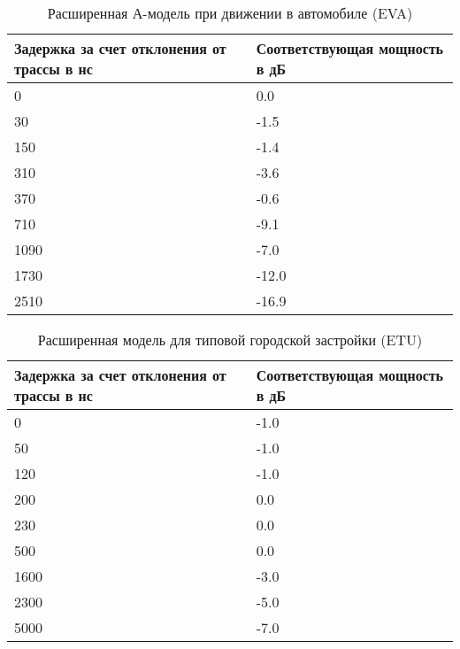 \begin{table} [htb]
  \centering
\parbox{15cm}{\caption{Расширенная А-модель при движении в автомобиле (EVA) \cite{TS36104}}\label{EVA}}
\begin{tabular}{|p{7cm}|p{7cm}|}
    \hline
    \hline
    Задержка за счет отклонения от трассы в нс &  Соответствующая мощность в дБ \\ \hline \hline
    0                                          & 0.0                           \\ \hline
    30                                         & -1.5                          \\ \hline
    150                                        & -1.4                          \\ \hline
    310                                        & -3.6                          \\ \hline
    370                                        & -0.6                          \\ \hline
    710                                        & -9.1                          \\ \hline
    1090                                       & -7.0                          \\ \hline
    1730                                       & -12.0                         \\ \hline
    2510                                       & -16.9                         \\ \hline
    \end{tabular}
\end{table}


\begin{table} [htb]
  \centering
\parbox{15cm}{\caption{Расширенная модель для типовой городской застройки (ETU) \cite{TS36104}}\label{ETU}}
\begin{tabular}{|p{7cm}|p{7cm}|}
    \hline
    \hline
    Задержка за счет отклонения от трассы в нс &  Соответствующая мощность в дБ \\ \hline \hline
    0    & -1.0 \\ \hline
    50   & -1.0 \\ \hline
    120  & -1.0 \\ \hline
    200  & 0.0  \\ \hline
    230  & 0.0  \\ \hline
    500  & 0.0  \\ \hline
    1600 & -3.0 \\ \hline
    2300 & -5.0 \\ \hline
    5000 & -7.0 \\ \hline
    \end{tabular}
\end{table}



